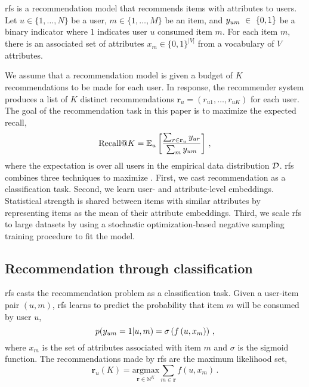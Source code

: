 \acrlong{rfs} is a recommendation model that recommends items with attributes to
users. Let $u \in \{1, \ldots, N\}$ be a user, $m \in \{1, \ldots, M\}$ be an
item, and $y_{um}~\in~\{0,1\}$ be a binary indicator where $1$ indicates user $u$
consumed item $m$. For each item $m$, there is an associated set of attributes
$x_m \in \{0,1\}^{|V|}$ from a vocabulary of $V$ attributes.

We assume that a recommendation model is given a budget of $K$ recommendations
to be made for each user. In response, the recommender system produces a list of
$K$ distinct recommendations $\mathbf{r}_u = (r_{u1}, \ldots, r_{uK})$ for each
user. The goal of the recommendation task in this paper is to maximize the
expected recall,
\begin{equation}
\label{eqn:recall}
\text{Recall@}K = \mathbb{E}_u\left[\frac{\sum_{r \in \mathbf{r}_u} y_{ur}}{\sum_{m} y_{um}}\right] \, ,
\end{equation}
where the expectation is over all users in the empirical data distribution
$\mathcal{D}$. \acrfull{rfs} combines three techniques to maximize .
First, we cast recommendation as a classification task. Second, we learn user-
and attribute-level embeddings. Statistical strength is shared between items
with similar attributes by representing items as the mean of their attribute
embeddings. Third, we scale \gls{rfs} to large datasets by using a stochastic
optimization-based negative sampling training procedure to fit the model.

\subsection{Recommendation through classification}
\label{subsec:rankfromsets:classification}
\acrfull{rfs} casts the recommendation problem as a classification task. Given a
user-item pair $(u,m)$, \gls{rfs} learns to predict the probability that item
$m$ will be consumed by user $u$,
\begin{equation}
\label{eqn:prob_y_given_um}
p(y_{um} = 1 | u, m) = \sigma\left( f \left(u, x_m\right) \right) \, ,
\end{equation}
where $x_m$ is the set of attributes associated with item $m$ and $\sigma$ is
the sigmoid function. The recommendations made by \gls{rfs} are the maximum
likelihood set,
\begin{equation}
\label{eqn:argmax}
\mathbf{r}_u(K) = \underset{\mathbf{r} \in \mathbb{N}^K}{\text{argmax}} \sum_{m\in\mathbf{r}} f \left( u, x_{m} \right) \, .
\end{equation}

